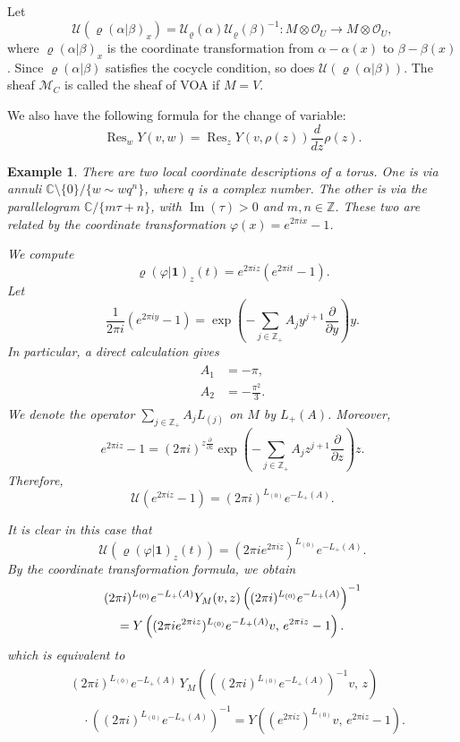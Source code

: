 \documentclass[9pt]{amsart}
\newtheorem{example}{Example}[section]
\begin{document}
Let
\[
\mathcal{U}(\varrho(\alpha|\beta)_{x}) = \mathcal{U}_{\varrho}(\alpha) \mathcal{U}_{\varrho}(\beta)^{-1}: M \otimes \mathcal{O}_U \rightarrow M \otimes \mathcal{O}_U,
\]
where $\varrho(\alpha|\beta)_{x}$ is the coordinate transformation from $\alpha - \alpha(x)$ to $\beta - \beta(x)$. Since $\varrho(\alpha|\beta)$ satisfies the cocycle condition, so does $\mathcal{U}(\varrho(\alpha|\beta))$. The sheaf $\mathcal{M}_C$ is called the sheaf of VOA if $M = V$.

We also have the following formula for the change of variable:
\[
\operatorname{Res}_{w} Y(v,w) = \operatorname{Res}_{z} Y(v,\rho(z))\frac{d}{dz}\rho(z).
\]

\begin{example}\label{ctft}
There are two local coordinate descriptions of a torus. One is via annuli $\mathbb{C} \setminus \{0\} / \{w \sim w q^{n}\}$, where $q$ is a complex number. The other is via the parallelogram $\mathbb{C} / \{m\tau + n\}$, with $\operatorname{Im}(\tau) > 0$ and $m,n \in \mathbb{Z}$. These two are related by the coordinate transformation $\varphi(x) = e^{2\pi i x} - 1$. 

We compute
\[
\varrho(\varphi|\mathbf{1})_{z}(t) = e^{2\pi i z}(e^{2\pi i t} - 1).
\]
Let
\[
\frac{1}{2\pi i}(e^{2\pi i y} - 1) = \exp\left(-\sum_{j \in \mathbb{Z}_{+}} A_{j} y^{j+1} \frac{\partial}{\partial y}\right)y.
\]
In particular, a direct calculation gives
\begin{align}\label{cdtfms}
\begin{split}
A_{1} &= -\pi, \\
A_{2} &= -\frac{\pi^{2}}{3}.
\end{split}
\end{align}
We denote the operator $\sum_{j \in \mathbb{Z}_{+}} A_{j} L_{(j)}$ on $M$ by $L_{+}(A)$. Moreover,
\[
e^{2\pi i z} - 1 = (2\pi i)^{z \frac{\partial}{\partial z}} \exp\left(-\sum_{j \in \mathbb{Z}_{+}} A_{j} z^{j+1} \frac{\partial}{\partial z}\right) z.
\]
Therefore,
\[
\mathcal{U}(e^{2\pi i z} - 1) = (2\pi i)^{L_{(0)}} e^{-L_{+}(A)}.
\]

It is clear in this case that
\[
\mathcal{U}(\varrho(\varphi|\mathbf{1})_{z}(t)) = (2\pi i e^{2\pi i z})^{L_{(0)}} e^{-L_{+}(A)}.
\]
By the coordinate transformation formula, we obtain
\begin{align}\label{ccoor2}
  &(2\pi i)^{L_{(0)}} e^{-L_{+}(A)} Y_{M}(v,z) 
  \left((2\pi i)^{L_{(0)}} e^{-L_{+}(A)}\right)^{-1} \notag\\
  &\quad = Y\left((2\pi i e^{2\pi i z})^{L_{(0)}} e^{-L_{+}(A)} v,\, e^{2\pi i z} - 1\right).
\end{align}
which is equivalent to
\begin{align}\label{cccoor1}
\begin{split}
& (2\pi i)^{L_{(0)}} e^{-L_{+}(A)}\,
Y_{M}\left( \left((2\pi i)^{L_{(0)}} e^{-L_{+}(A)}\right)^{-1} v,\, z \right) \\
&\quad \cdot \left((2\pi i)^{L_{(0)}} e^{-L_{+}(A)}\right)^{-1}
= Y\left((e^{2\pi i z})^{L_{(0)}} v,\, e^{2\pi i z} - 1\right).
\end{split}
\end{align}


\end{example}
\end{document}
